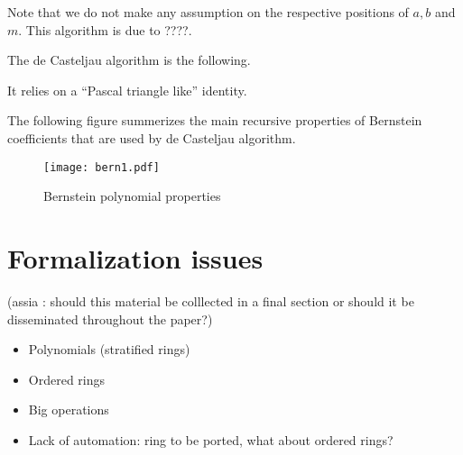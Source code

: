 \documentclass{mscs}
\begin{document}
 Note that we do not make any assumption on the respective
positions of $a, b$ and $m$. This algorithm is due to ????.

The de Casteljau algorithm is the following.

It relies on a ``Pascal triangle like'' identity.


The following figure summerizes the main recursive properties of
Bernstein coefficients that are used by de Casteljau algorithm.
\begin{figure}\label{bern}
\begin{center}
\texttt{[image: bern1.pdf]}
\end{center}
\caption{Bernstein polynomial properties}
\end{figure}



\section{Formalization issues}

(assia : should this material be colllected in a final section or
should it be disseminated throughout the paper?)

\begin{itemize}
\item Polynomials (stratified rings)
\item Ordered rings
\item Big operations
\item Lack of automation: ring to be ported, what about ordered rings?
\end{itemize}



\end{document}
